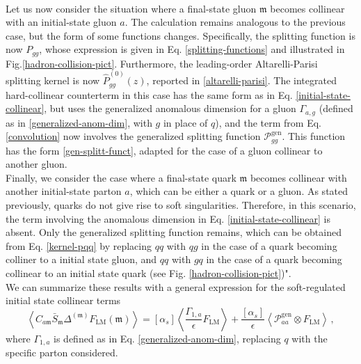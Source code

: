 \documentclass[a4paper, 12pt]{book}
\newcommand{\um}{\mathfrak{m}}
\begin{document}
\\
Let us now consider the situation where a final-state gluon $\um$ becomes collinear with an initial-state gluon $a$. The calculation remains analogous to the previous case, but the form of some functions changes. Specifically, the splitting function is now $P_{gg}$, whose expression is given in Eq. \ref{splitting-functions} and illustrated in Fig.\ref{hadron-collision-pict}. Furthermore, the leading-order Altarelli-Parisi splitting kernel is now $\hat{P}_{gg}^{(0)}(z)$, reported in \ref{altarelli-parisi}. The integrated hard-collinear counterterm in this case has the same form as in Eq. \ref{initial-state-collinear}, but uses the generalized anomalous dimension for a gluon $\Gamma_{a,g}$ (defined as in \ref{generalized-anom-dim}, with $g$ in place of $q$), and the term from Eq. \ref{convolution} now involves the generalized splitting function $\mathcal{P}_{gg}^{\mathrm{gen}}$. This function has the form \ref{gen-splitt-funct}, adapted for the case of a gluon collinear to another gluon. \\

Finally, we consider the case where a final-state quark $\um$ becomes collinear with another initial-state parton $a$, which can be either a quark or a gluon. As stated previously, quarks do not give rise to soft singularities. Therefore, in this scenario, the term involving the anomalous dimension in Eq. \ref{initial-state-collinear} is absent. Only the generalized splitting function remains, which can be obtained from Eq. \ref{kernel-pqq} by replacing $qq$ with $qg$ in the case of a quark becoming colliner to a initial state gluon, and $qq$ with $gq$ in the case of a quark becoming collinear to an initial state quark (see Fig. \ref{hadron-collision-pict})". \\

We can summarize these results with a general expression for the soft-regulated initial state collinear terms
\begin{equation}
  \left< C_{a\um} \bar{S}_\um \Delta^{(\um)} F_{\mathrm{LM}} (\um) \right> = [\alpha_s] \left< \frac{\Gamma_{1,a}}{\epsilon} F_{\mathrm{LM}} \right> + \frac{[\alpha_s]}{\epsilon}\left< \mathcal{P}_{aa}^{\mathrm{gen}} \otimes F_{\mathrm{LM}} \right> \, ,
  \label{initial-state-collinear}
\end{equation}
where $\Gamma_{1,a}$ is defined as in Eq. \ref{generalized-anom-dim}, replacing $q$ with the specific parton considered.
\end{document}
